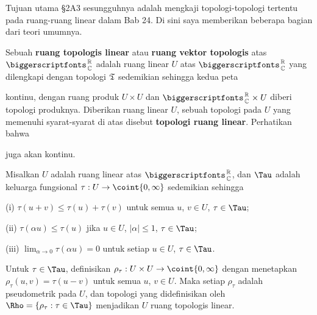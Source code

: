 
\def\chaptername{Lampiran}
\def\sectionname{Ruang topologis linear}


Tujuan utama \S2A3 sesungguhnya adalah mengkaji topologi-topologi
tertentu pada ruang-ruang linear dalam Bab 24. Di sini saya memberikan
beberapa bagian dari teori umumnya.

 Sebuah {\bf ruang topologis linear} atau
{\bf ruang vektor topologis} atas $\RoverC$ adalah ruang linear $U$
atas $\RoverC$ yang dilengkapi dengan topologi $\frak T$ sedemikian
sehingga kedua peta



\noindent kontinu, dengan ruang produk $U\times U$ dan
$\RoverC\times U$ diberi topologi produknya. Diberikan
ruang linear $U$, sebuah topologi pada $U$ yang memenuhi syarat-syarat
di atas disebut {\bf topologi ruang linear}. Perhatikan bahwa


\noindent juga akan kontinu.

 Misalkan $U$ adalah ruang linear atas
$\RoverC$, dan $\Tau$ adalah keluarga fungsional
$\tau:U\to\coint{0,\infty}$ sedemikian sehingga

\quad (i) $\tau(u+v)\le\tau(u)+\tau(v)$ untuk semua $u$, $v\in U$,
$\tau\in\Tau$;

\quad (ii) $\tau(\alpha u)\le\tau(u)$ jika $u\in U$, $|\alpha|\le 1$,
$\tau\in\Tau$;

\quad (iii) $\lim_{\alpha\to 0}\tau(\alpha u)=0$ untuk setiap $u\in U$,
$\tau\in \Tau$.

\noindent Untuk $\tau\in\Tau$, definisikan
$\rho_{\tau}:U\times U\to\coint{0,\infty}$ dengan menetapkan
$\rho_{\tau}(u,v)=\tau(u-v)$ untuk semua $u$, $v\in U$. Maka setiap
$\rho_{\tau}$ adalah pseudometrik pada $U$, dan topologi yang
didefinisikan oleh $\Rho=\{\rho_{\tau}:\tau\in\Tau\}$ menjadikan $U$
ruang topologis linear.

